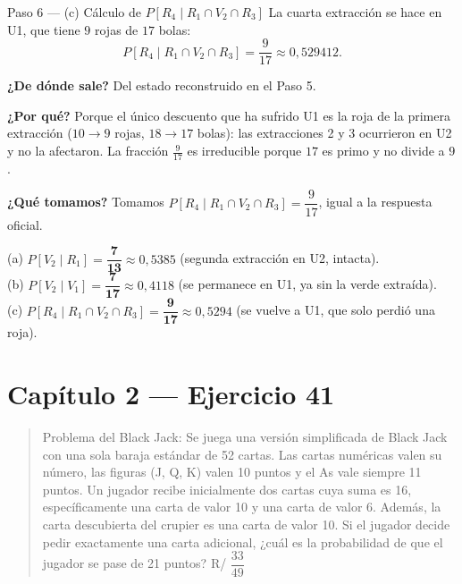 \documentclass[11pt]{article}
\begin{document}
\begin{sol}
\begin{paso}{Paso 6 --- (c) C\'alculo de $P[R_4\mid R_1\cap V_2\cap R_3]$}
La cuarta extracci\'on se hace en U1, que tiene $9$ rojas de $17$ bolas:
\[
P[R_4\mid R_1\cap V_2\cap R_3]=\frac{9}{17}\approx 0{,}529412 .
\]

\textbf{¿De d\'onde sale?} Del estado reconstruido en el Paso 5.

\textbf{¿Por qu\'e?} Porque el \'unico descuento que ha sufrido U1 es la roja de la primera extracci\'on ($10\to 9$ rojas, $18\to 17$ bolas): las extracciones 2 y 3 ocurrieron en U2 y no la afectaron. La fracci\'on $\frac{9}{17}$ es irreducible porque $17$ es primo y no divide a $9$.

\textbf{¿Qu\'e tomamos?} Tomamos $P[R_4\mid R_1\cap V_2\cap R_3]=\dfrac{9}{17}$, igual a la respuesta oficial.
\end{paso}

\end{sol}

\begin{resp}
(a) $P[V_2\mid R_1]=\mathbf{\dfrac{7}{13}}\approx 0{,}5385$ (segunda extracci\'on en U2, intacta).\\[2pt]
(b) $P[V_2\mid V_1]=\mathbf{\dfrac{7}{17}}\approx 0{,}4118$ (se permanece en U1, ya sin la verde extra\'ida).\\[2pt]
(c) $P[R_4\mid R_1\cap V_2\cap R_3]=\mathbf{\dfrac{9}{17}}\approx 0{,}5294$ (se vuelve a U1, que solo perdi\'o una roja).
\end{resp}

\section*{Cap\'itulo 2 --- Ejercicio 41}

\begin{quote}
Problema del Black Jack: Se juega una versi\'on simplificada de Black Jack con una sola baraja est\'andar de 52 cartas. Las cartas num\'ericas valen su n\'umero, las figuras (J, Q, K) valen 10 puntos y el As vale siempre 11 puntos. Un jugador recibe inicialmente dos cartas cuya suma es 16, espec\'ificamente una carta de valor 10 y una carta de valor 6. Adem\'as, la carta descubierta del crupier es una carta de valor 10. Si el jugador decide pedir exactamente una carta adicional, ¿cu\'al es la probabilidad de que el jugador se pase de 21 puntos? \hfill R/ $\dfrac{33}{49}$
\end{quote}
\end{document}
